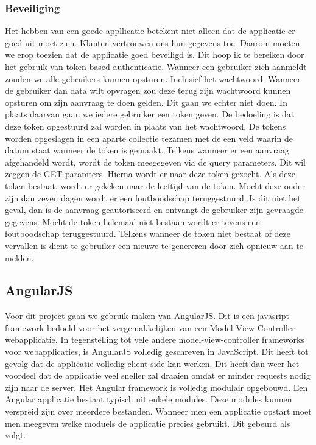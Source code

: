 \documentclass[a4paper,11pt]{article}
\begin{document}
\subsubsection{Beveiliging}
Het hebben van een goede appllicatie betekent niet alleen dat de applicatie er goed uit moet zien. Klanten vertrouwen ons hun gegevens toe. Daarom moeten we erop toezien dat de applicatie goed beveiligd is. Dit hoop ik te bereiken door het gebruik van token based authenticatie. Wanneer een gebruiker zich aanmeldt zouden we alle gebruikers kunnen opsturen. Inclusief het wachtwoord. Wanneer de gebruiker dan data wilt opvragen zou deze terug zijn wachtwoord kunnen opsturen om zijn aanvraag te doen gelden. Dit gaan we echter niet doen. In plaats daarvan gaan we iedere gebruiker een token geven. De bedoeling is dat deze token opgestuurd zal worden in plaats van het wachtwoord. De tokens worden opgeslagen in een aparte collectie tezamen met de een veld waarin de datum staat wanneer de token is gemaakt. Telkens wanneer er een aanvraag afgehandeld wordt, wordt de token meegegeven via de query parameters. Dit wil zeggen de GET paramters. Hierna wordt er naar deze token gezocht. Als deze token bestaat, wordt er gekeken naar de leeftijd van de token. Mocht deze ouder zijn dan zeven dagen wordt er een foutboodschap teruggestuurd. Is dit niet het geval, dan is de aanvraag geautoriseerd en ontvangt de gebruiker zijn gevraagde gegevens. Mocht de token helemaal niet bestaan wordt er tevens een foutboodschap teruggestuurd. Telkens wanneer de token niet bestaat of deze vervallen is dient te gebruiker een nieuwe te genereren door zich opnieuw aan te melden.

\subsection{AngularJS}
Voor dit project gaan we gebruik maken van AngularJS. Dit is een javasript framework bedoeld voor het vergemakkelijken van een Model View Controller webapplicatie. In tegenstelling tot vele andere model-view-controller frameworks voor webapplicaties, is AngularJS volledig geschreven in JavaScript. Dit heeft tot gevolg dat de applicatie volledig client-side kan werken. Dit heeft dan weer het voordeel dat de applicatie veel sneller zal draaien omdat er minder requests nodig zijn naar de server. Het Angular framework is volledig modulair opgebouwd. Een Angular applicatie bestaat typisch uit enkele modules. Deze modules kunnen verspreid zijn over meerdere bestanden. Wanneer men een applicatie opstart moet men meegeven welke moduels de applicatie precies gebruikt. Dit gebeurd als volgt.
\end{document}
